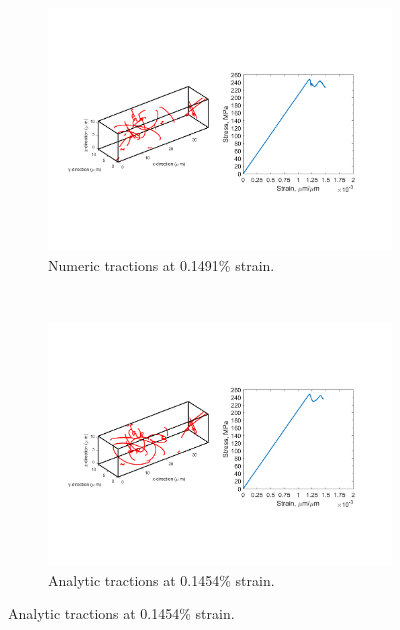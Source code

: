\begin{figure}
    \begin{subfigure}[t]{0.45\linewidth}
        \centering
        \includegraphics[trim={1.75cm 6.75cm 15.75cm 6.75cm},clip,width=\linewidth]{../data/11-Mar-2021_numT_8_tensile_ni_100_81600.pdf}
        \caption{Numeric tractions at 0.1491\% strain.}
    \end{subfigure}
    ~
    \begin{subfigure}[t]{0.45\linewidth}
        \centering
        \includegraphics[trim={1.75cm 6.75cm 15.75cm 6.75cm},clip,width=\linewidth]{../data/11-Mar-2021_8_tensile_ni_100_60000.pdf}
        \caption{Analytic tractions at 0.1454\% strain.}
    \end{subfigure}


\end{figure}

